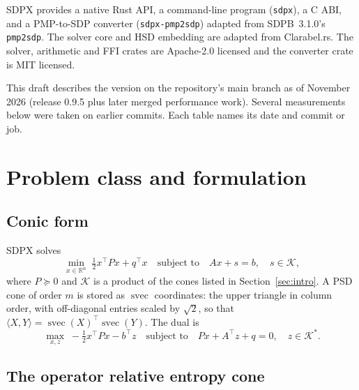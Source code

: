\documentclass[11pt]{article}
\newcommand{\R}{\mathbb{R}}
\newcommand{\K}{\mathcal{K}}
\newcommand{\svec}{\operatorname{svec}}
\newcommand{\code}[1]{\texttt{#1}}
\begin{document}
SDPX provides a native Rust API, a command-line program (\code{sdpx}), a C ABI,
and a PMP-to-SDP converter (\code{sdpx-pmp2sdp}) adapted from SDPB~3.1.0's
\code{pmp2sdp}. The solver core and HSD embedding are adapted from
Clarabel.rs. The solver, arithmetic and FFI crates are Apache-2.0 licensed and
the converter crate is MIT licensed.

This draft describes the version on the repository's main branch as of
November 2026 (release 0.9.5 plus later merged performance work). Several
measurements below were taken on earlier commits. Each table names its date
and commit or job.

\section{Problem class and formulation}
\label{sec:formulation}

\subsection{Conic form}

SDPX solves
\begin{equation}
  \min_{x\in\R^n}\; \tfrac12 x^\top P x + q^\top x
  \quad\text{subject to}\quad Ax + s = b,\quad s \in \K,
  \label{eq:primal}
\end{equation}
where $P \succeq 0$ and $\K$ is a product of the cones listed in
Section~\ref{sec:intro}. A PSD cone of order $m$ is stored as $\svec$
coordinates: the upper triangle in column order, with off-diagonal entries
scaled by $\sqrt2$, so that $\langle X, Y\rangle = \svec(X)^\top \svec(Y)$.
The dual is
\begin{equation}
  \max_{x,z}\; -\tfrac12 x^\top P x - b^\top z
  \quad\text{subject to}\quad Px + A^\top z + q = 0,\quad z\in\K^*.
\end{equation}

\subsection{The operator relative entropy cone}\label{sec:ore}
\end{document}
